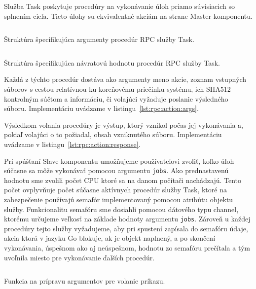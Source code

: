 Služba Task poskytuje procedúry na vykonávanie úloh priamo súvisiacich so
splnením cieľa. Tieto úlohy su ekvivalentné akciám na strane Master komponentu.

\begin{listing}[H]
  \inputminted[frame=lines,framesep=2mm,linenos,fontsize=\scriptsize,firstline=8,lastline=12]{go}{/home/pepol/src/imterra/forge/proto/proto.go}
  \caption[Argumenty služby Task]{Štruktúra špecifikujúca argumenty procedúr RPC služby Task.}
  \label{lst:rpc:action:args}
\end{listing}

\begin{listing}[H]
  \inputminted[frame=lines,framesep=2mm,linenos,fontsize=\scriptsize,firstline=14,lastline=17]{go}{/home/pepol/src/imterra/forge/proto/proto.go}
  \caption[Návratová hodnota služby Task]{Štruktúra špecifikujúca návratovú hodnotu procedúr RPC služby Task.}
  \label{lst:rpc:action:response}
\end{listing}

Každá z týchto procedúr dostáva ako argumenty meno akcie, zoznam vstupných súborov
s cestou relatívnou ku koreňovému priečinku systému, ich SHA512 kontrolným súčtom a informáciu, či volajúci
vyžaduje poslanie výsledného súboru. Implementáciu uvádzame v listingu~\ref{lst:rpc:action:args}.

Výsledkom volania procedúry je výstup, ktorý vznikol počas jej vykonávania a,
pokiaľ volajúci o to požiadal, obsah vzniknutého súboru. Implementáciu uvádzame
v listingu~\ref{lst:rpc:action:response}.

Pri spúšťaní Slave komponentu umožňujeme používateľovi zvoliť, koľko úloh súčasne sa
môže vykonávať pomocou argumentu \texttt{jobs}. Ako prednastavenú hodnotu sme zvolili počet
CPU ktoré sa na danom počítači nachádzajú. Tento počet ovplyvňuje počet súčasne
aktívnych procedúr služby Task, ktoré na zabezpečenie používajú semafór implementovaný
pomocou atribútu objektu služby. Funkcionalitu semafóru sme dosiahli pomocou
dátového typu channel, ktorému určujeme veľkosť na základe hodnoty argumentu \texttt{jobs}.
Zároveň u každej procedúry tejto služby vyžadujeme, aby pri spustení zapísala do semafóru
údaje, akcia ktorá v jazyku Go blokuje, ak je objekt naplnený, a po skončení vykonávania,
úspešnom ako aj neúspešnom, hodnotu zo semafóru prečítala a tým uvoľnila miesto pre
vykonávanie ďalších procedúr.

\begin{listing}[H]
  \inputminted[frame=lines,framesep=2mm,linenos,fontsize=\scriptsize,firstline=9,lastline=22]{go}{/home/pepol/src/imterra/forge/worker/tasks/util.go}
  \caption{Funkcia na prípravu argumentov pre volanie príkazu.}
  \label{lst:rpc:processinputs}
\end{listing}

